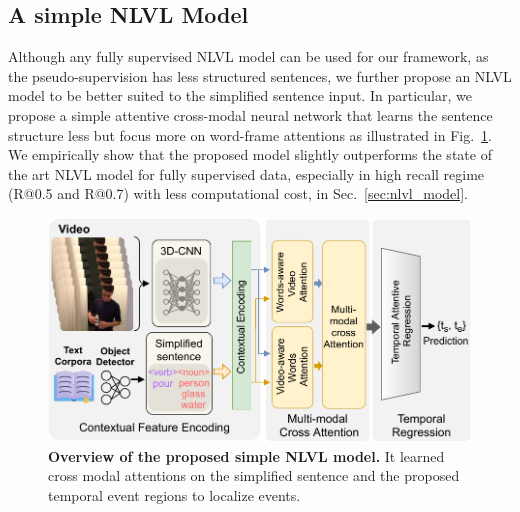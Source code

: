 \subsection{A simple NLVL Model}
\label{sec:approach:nlvlmodel}

%
Although any fully supervised NLVL model can be used for our framework, as the pseudo-supervision has less structured sentences, we further propose an NLVL model to be better suited to the simplified sentence input. 
In particular, we propose a simple attentive cross-modal neural network that learns the sentence structure less but focus more on word-frame attentions as illustrated in Fig.~\ref{fig:model}. 
We empirically show that the proposed model slightly outperforms the state of the art NLVL model for fully supervised data, especially in high recall regime (R@0.5 and R@0.7) with less computational cost, in Sec.~\ref{sec:nlvl_model}.

\begin{figure}[t]
    \centering
    \includegraphics[width=0.99\linewidth]{figures/model.pdf}
    \caption{\textbf{Overview of the proposed simple NLVL model.} It learned cross modal attentions on the simplified sentence and the proposed temporal event regions  to localize events.} %
    \label{fig:model}
    \vspace{-0.8em}
\end{figure}

